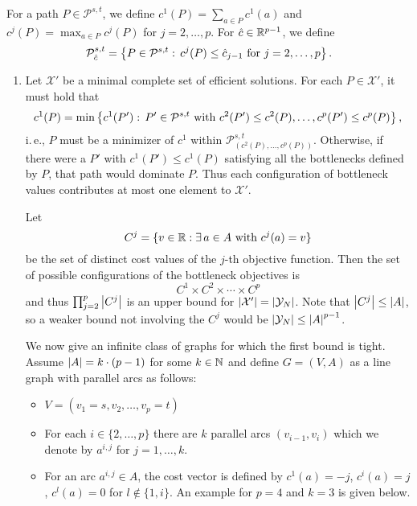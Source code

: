 \documentclass[11pt,english,a4paper,parskip=half-]{scrartcl}
\begin{document}
\begin{solution}
  For a path $P \in \mathcal P^{s,t}$, we define $c^1(P) = \sum_{a \in P} c^1(a)$
  and $c^j(P) = \max_{a \in P} c^j(P)$ for $j=2,\dotsc,p$. For
  $\hat c \in \mathbb{R}^{p-1}$, we define 
  \[\mathcal P^{s,t}_{\hat c} = \left\{ P \in \mathcal P^{s,t}:\,
  c^j(P) \leq \hat c_{j-1} \text{ for }j=2,\dotsc,p\right\} \text{.}\]
  \begin{enumerate}
	  \item Let $\mathcal X'$ be a minimal complete set of efficient solutions.
	  For each
	  $P \in \mathcal X'$, it must hold that
	  \[c^1(P) = \min\left\{c^1(P'):\,
	  P' \in \mathcal P^{s,t}\text{ with }c^2(P') \leq c^2(P), \dotsc,
	  c^p(P') \leq c^p(P)\right\}\text{,}\]
	  i.\,e., $P$ must be a minimizer of $c^1$ within $\mathcal P^{s,t}_{(c^2(P),\dotsc,c^p(P))}$. Otherwise, if there were a $P'$ with $c^1(P') \leq c^1(P)$ satisfying
	  all the bottlenecks defined by $P$, that path would dominate $P$. Thus
	  each configuration of bottleneck values contributes at most one element
	  to $\mathcal X'$.
	  
	  Let \[C^j = \{ v \in \mathbb{R}: \exists\, a \in A\text{ with } c^j(a) = v\}\]
	  be the set of distinct cost values of the $j$-th objective function. Then
	  the set of possible configurations of the bottleneck objectives is
	\[ C^1 \times C^2 \times \dotsm \times C^p \]
	and thus $\prod_{j=2}^p \left\lvert C^j \right\rvert$ is an upper bound for $\left\lvert \mathcal X' \right\rvert
	= \left\lvert \mathcal Y_N \right\rvert$. Note
	that $\left\lvert C^j \right\rvert \leq \left\lvert A \right\rvert$, so a weaker bound not involving the $C^j$ would
	be $\left\lvert \mathcal Y_N \right\rvert \leq {\left\lvert A \right\rvert}^{p-1}$.
	
  We now give an infinite class of graphs for which the first bound is tight.
  Assume $\left\lvert A \right\rvert = k\cdot (p-1)$ for some $k \in \mathbb{N}$ and define 
  $G = (V,A)$ as a line graph with parallel arcs as follows:
  \begin{itemize}
		\item $V = (v_1 = s, v_2, \dotsc,  v_p = t)$
	  \item For each $i \in \{2,\dotsc,p\}$ there are $k$ parallel arcs $(v_{i-1},v_i)$ which we denote by $ a^{i,j}$ for $j=1,\dotsc,k$.
	  \item For an arc $a^{i,j} \in A$, the cost vector is defined by
	  $c^1(a) = -j$, $c^i(a) = j$, $c^l(a) = 0$ for $l \notin \{1,i\}$.
	  An example for $p=4$ and $k=3$ is given below.
  \end{itemize}
	\begin{center}
\end{center}
\end{enumerate}
\end{solution}
\end{document}
